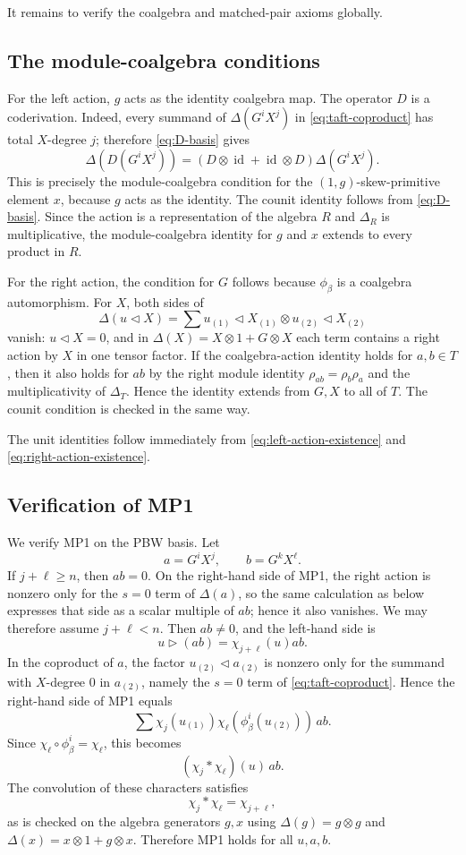 \documentclass[twoside,11pt]{amsart}
\newcommand{\id}{\operatorname{id}}
\begin{document}
	It remains to verify the coalgebra and matched-pair axioms globally.
	
	\subsection{The module-coalgebra conditions}
	
	For the left action, $g$ acts as the identity coalgebra map. The operator $D$
	is a coderivation. Indeed, every summand of
	$\Delta(G^iX^j)$ in \eqref{eq:taft-coproduct} has total $X$-degree $j$;
	therefore \eqref{eq:D-basis} gives
	\[
	\Delta(D(G^iX^j))
	=(D\otimes\id+\id\otimes D)\Delta(G^iX^j).
	\]
	This is precisely the module-coalgebra condition for the
	$(1,g)$-skew-primitive element $x$, because $g$ acts as the identity. The
	counit identity follows from \eqref{eq:D-basis}. Since the action is a
	representation of the algebra $R$ and $\Delta_R$ is multiplicative, the
	module-coalgebra identity for $g$ and $x$ extends to every product in $R$.
	
	For the right action, the condition for $G$ follows because $\phi_\beta$ is a
	coalgebra automorphism. For $X$, both sides of
	\[
	\Delta(u\triangleleft X)
	=\sum u_{(1)}\triangleleft X_{(1)}
	\otimes u_{(2)}\triangleleft X_{(2)}
	\]
	vanish: $u\triangleleft X=0$, and in
	$\Delta(X)=X\otimes1+G\otimes X$ each term contains a right action by $X$ in
	one tensor factor. If the coalgebra-action identity holds for $a,b\in T$,
	then it also holds for $ab$ by the right module identity
	$\rho_{ab}=\rho_b\rho_a$ and the multiplicativity of $\Delta_T$. Hence the
	identity extends from $G,X$ to all of $T$. The counit condition is checked in
	the same way.
	
	The unit identities follow immediately from
	\eqref{eq:left-action-existence} and \eqref{eq:right-action-existence}.
	
	\subsection{Verification of MP1}
	
	We verify MP1 on the PBW basis. Let
	\[
	a=G^iX^j,
	\qquad
	b=G^kX^\ell.
	\]
	If $j+\ell\ge n$, then $ab=0$. On the right-hand side of MP1, the right
	action is nonzero only for the $s=0$ term of $\Delta(a)$, so the same
	calculation as below expresses that side as a scalar multiple of $ab$;
	hence it also vanishes. We may therefore assume $j+\ell<n$. Then $ab\ne0$,
	and the left-hand side is
	\[
	u\triangleright(ab)=\chi_{j+\ell}(u)ab.
	\]
	In the coproduct of $a$, the factor
	$u_{(2)}\triangleleft a_{(2)}$ is nonzero only for the summand with
	$X$-degree $0$ in $a_{(2)}$, namely the $s=0$ term of
	\eqref{eq:taft-coproduct}. Hence the right-hand side of MP1 equals
	\[
	\sum \chi_j(u_{(1)})
	\chi_\ell(\phi_\beta^i(u_{(2)}))\,ab.
	\]
	Since $\chi_\ell\circ\phi_\beta^i=\chi_\ell$, this becomes
	\[
	(\chi_j*\chi_\ell)(u)\,ab.
	\]
	The convolution of these characters satisfies
	\[
	\chi_j*\chi_\ell=\chi_{j+\ell},
	\]
	as is checked on the algebra generators $g,x$ using
	$\Delta(g)=g\otimes g$ and $\Delta(x)=x\otimes1+g\otimes x$. Therefore MP1
	holds for all $u,a,b$.
	
\end{document}

